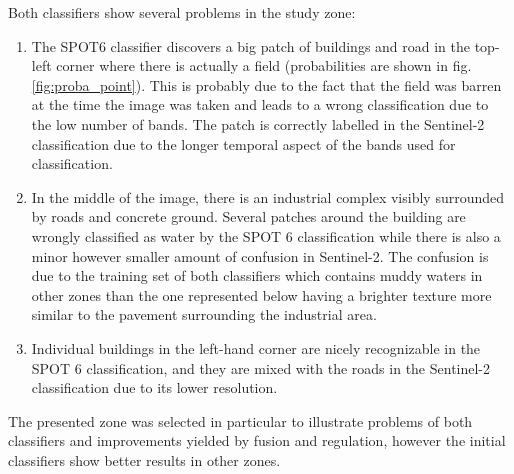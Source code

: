 \documentclass[10pt]{article}
\begin{document}
Both classifiers show several problems in the study zone:
\begin{enumerate}
    \item The SPOT6 classifier discovers a big patch of buildings and road in the top-left corner where there is actually a field (probabilities are shown in fig. \ref{fig:proba_point}). This is probably due to the fact that the field was barren at the time the image was taken and leads to a wrong classification due to the low number of bands. The patch is correctly labelled in the Sentinel-2 classification due to the longer temporal aspect of the bands used for classification.
    \item In the middle of the image, there is an industrial complex visibly surrounded by roads and concrete ground. Several patches around the building are wrongly classified as water by the SPOT 6 classification while there is also a minor however smaller amount of confusion in Sentinel-2. The confusion is due to the training set of both classifiers which contains muddy waters in other zones than the one represented below having a brighter texture more similar to the pavement surrounding the industrial area.
    \item Individual buildings in the left-hand corner are nicely recognizable in the SPOT 6 classification, and they are mixed with the roads in the Sentinel-2 classification due to its lower resolution.
\end{enumerate}
The presented zone was selected in particular to illustrate problems of both classifiers and improvements yielded by fusion and regulation, however the initial classifiers show better results in other zones. %
\end{document}
